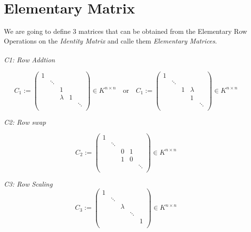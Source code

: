 \newpage
\section{Elementary Matrix}

We are going to define 3 matrices that can be obtained from the Elementary Row
Operations on the \emph{Identity Matrix} and calle them \emph{Elementary Matrices}.
\\\\
\emph{C1: Row Addtion}

\[
C_1 := 
\begin{pmatrix}
1      &        &        &        &        \\
       & \ddots &        &        &        \\
       &        & 1      &        &        \\
       &        & \lambda & 1     &        \\
       &        &        &        & \ddots \\
\end{pmatrix}
\in K^{n \times n}
\quad \text{or} \quad
C_1 := 
\begin{pmatrix}
1      &        &        &        &        \\
       & \ddots &        &        &        \\
       &        & 1      & \lambda &        \\
       &        &        & 1      &        \\
       &        &        &        & \ddots \\
\end{pmatrix}
\in K^{n \times n}
\]


\emph{C2: Row swap}

\[
C_2 := 
\begin{pmatrix}
1      &        &        &        &        \\
       & \ddots &        &        &        \\
       &        & 0      & 1      &        \\
       &        & 1      & 0      &        \\
       &        &        &        & \ddots \\
\end{pmatrix}
\in K^{n \times n}
\]


\emph{C3: Row Scaling}
\[
C_3 := 
\begin{pmatrix}
1      &        &        &        &        \\
       & \ddots &        &        &        \\
       &        & \lambda &       &        \\
       &        &        & \ddots &        \\
       &        &        &        & 1      \\
\end{pmatrix}
\in K^{n \times n}
\]

